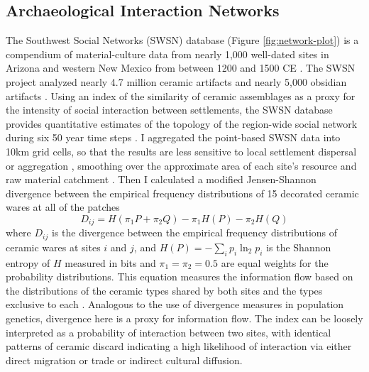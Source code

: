 \documentclass[10pt]{iopart}
\begin{document}
\subsection*{Archaeological Interaction Networks}
The Southwest Social Networks (SWSN) database (Figure \ref{fig:network-plot}) is a compendium of material-culture data from nearly 1,000 well-dated sites in Arizona and western New Mexico from between 1200 and 1500 CE \parencite{Mills2012,Mills2013a,Peeples2013,Borck2015,Hill2015,Mills2015a}. The SWSN project analyzed nearly 4.7 million ceramic artifacts and nearly 5,000 obsidian artifacts \parencite{Mills2015a}. Using an index of the similarity of ceramic assemblages as a proxy for the intensity of social interaction between settlements, the SWSN database provides quantitative estimates of the topology of the region-wide social network during six 50 year time steps \parencite{Mills2013a}. I aggregated the point-based SWSN data into 10km grid cells, so that the results are less sensitive to local settlement dispersal or aggregation \parencite{Paliou2016}, smoothing over the approximate area of each site's resource and raw material catchment \parencite{Varien1999}. Then I calculated a modified Jensen-Shannon divergence between the empirical frequency distributions of 15 decorated ceramic wares at all of the patches
\begin{equation}
    D_{ij} = H\left(\pi_1P + \pi_2Q\right) - \pi_1H(P) - \pi_2H(Q)
\end{equation}
where $D_{ij}$ is the divergence between the empirical frequency distributions of ceramic wares at sites $i$ and $j$, and $H(P) = -\sum_i p_i \ln_2 p_i$ is the Shannon entropy of $H$ measured in bits and $\pi_1 = \pi_2 = 0.5$ are equal weights for the probability distributions. This equation measures the information flow based on the distributions of the ceramic types shared by both sites and the types exclusive to each \parencite{Masucci2011,PaoloMasucci2012}. Analogous to the use of divergence measures in population genetics, divergence here is a proxy for information flow. The index can be loosely interpreted as a probability of interaction between two sites, with identical patterns of ceramic discard indicating a high likelihood of interaction via either direct migration or trade or indirect cultural diffusion.
\end{document}
